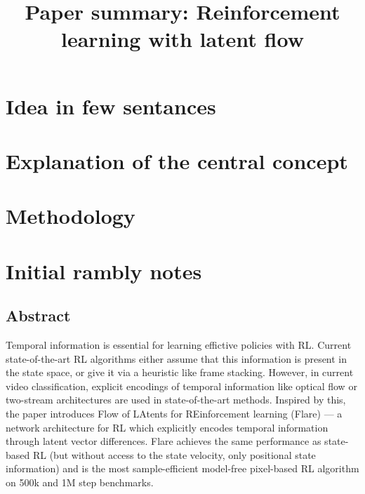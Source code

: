 \documentclass{article}
\title{Paper summary: Reinforcement learning with latent flow}
\begin{document}
\maketitle


\section{Idea in few sentances}



\section{Explanation of the central concept}




\section{Methodology}


\section{Initial rambly notes}


\subsection{Abstract}
Temporal information is essential for learning effictive policies with RL.
Current state-of-the-art RL algorithms either assume that this information is present 
in the state space, or give it via a heuristic like frame stacking.
However, in current video classification, explicit encodings of temporal information
like optical flow or two-stream architectures are used in state-of-the-art methods.
Inspired by this, the paper introduces Flow of LAtents for
REinforcement learning (Flare) --- a network architecture for RL 
which explicitly encodes temporal information through latent vector differences.
Flare achieves the same performance as state-based RL (but without access to the state velocity,
only positional state information) and is the most sample-efficient model-free pixel-based RL algorithm
on 500k and 1M step benchmarks.


\end{document}
